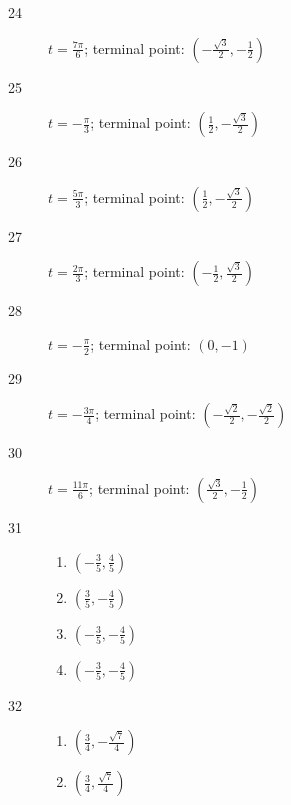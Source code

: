 \documentclass{exam}
\begin{document}
\begin{description}
      \item[24] $t = \frac{7 \pi}{6}$; terminal point: $\boxed{ \left( - \frac{\sqrt{3}}{2}, - \frac{1}{2} \right) }$

      \item[25] $t = -\frac{\pi}{3}$; terminal point: $\boxed{ \left( \frac{1}{2}, - \frac{\sqrt{3}}{2}  \right) }$

      \item[26] $t = \frac{5 \pi}{3}$; terminal point: $\boxed{ \left( \frac{1}{2}, - \frac{\sqrt{3}}{2}  \right) }$

      \item[27] $t = \frac{2 \pi}{3}$; terminal point: $\boxed{ \left( - \frac{1}{2}, \frac{\sqrt{3}}{2}  \right) }$

      \item[28] $t = -\frac{\pi}{2}$; terminal point: $\boxed{ \left( 0, -1 \right) }$

      \item[29] $t = - \frac{3 \pi}{4}$; terminal point: $\boxed{ \left( - \frac{\sqrt{2}}{2}, - \frac{\sqrt{2}}{2}  \right) }$
        
      \item[30] $t = \frac{11 \pi}{6}$; terminal point: $\boxed{ \left( \frac{\sqrt{3}}{2}, - \frac{1}{2}  \right) }$

      \item[31]
        \begin{enumerate}[a]
          \item $\boxed{ \left( - \frac{3}{5}, \frac{4}{5} \right) }$
        
          \item $\boxed{ \left( \frac{3}{5}, - \frac{4}{5} \right) }$

          \item $\boxed{ \left( - \frac{3}{5}, - \frac{4}{5} \right) }$

          \item $\boxed{ \left( - \frac{3}{5}, - \frac{4}{5} \right) }$

        \end{enumerate}

      \item[32]
        \begin{enumerate}[a]
          \item $\boxed{ \left( \frac{3}{4}, - \frac{\sqrt{7}}{4} \right) }$
        
          \item $\boxed{ \left( \frac{3}{4}, \frac{\sqrt{7}}{4} \right) }$


\end{enumerate}
\end{description}
\end{document}
